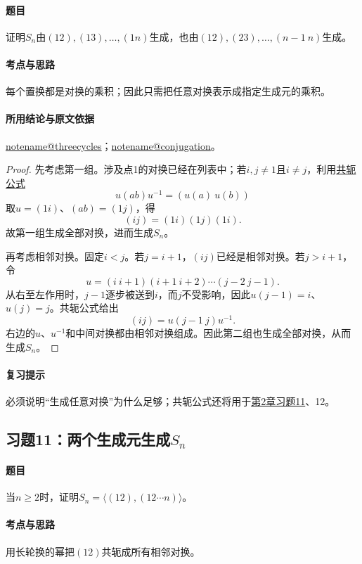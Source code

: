 \documentclass[UTF8,a4paper,11pt,fontset=windows]{ctexart}
\makeatletter
\newcommand{\noteref}[1]{\hyperref[note:#1]{\csname notename@#1\endcsname}}
\newcommand{\proofref}[2]{\hyperref[note:#1]{#2}}
\newcommand{\exref}[2]{\hyperref[ex:#1:#2]{第#1章习题#2}}
\makeatother
\begin{document}
\paragraph{题目}
证明$S_n$由$(12),(13),\ldots,(1n)$生成，也由$(12),(23),\ldots,(n-1\ n)$生成。

\paragraph{考点与思路}
每个置换都是对换的乘积；因此只需把任意对换表示成指定生成元的乘积。

\paragraph{所用结论与原文依据}
\noteref{threecycles}；\noteref{conjugation}。


\begin{proof}
先考虑第一组。涉及点1的对换已经在列表中；若$i,j\ne1$且$i\ne j$，利用\proofref{conjugation}{共轭公式}
\[
u(ab)u^{-1}=(u(a)\ u(b))
\]
取$u=(1i)$、$(ab)=(1j)$，得
\[
(ij)=(1i)(1j)(1i).
\]
故第一组生成全部对换，进而生成$S_n$。

再考虑相邻对换。固定$i<j$。若$j=i+1$，$(ij)$已经是相邻对换。若$j>i+1$，令
\[
u=(i\ i+1)(i+1\ i+2)\cdots(j-2\ j-1).
\]
从右至左作用时，$j-1$逐步被送到$i$，而$j$不受影响，因此$u(j-1)=i$、$u(j)=j$。共轭公式给出
\[
(ij)=u(j-1\ j)u^{-1}.
\]
右边的$u$、$u^{-1}$和中间对换都由相邻对换组成。因此第二组也生成全部对换，从而生成$S_n$。
\end{proof}

\paragraph{复习提示}
必须说明“生成任意对换”为什么足够；共轭公式还将用于\exref{2}{11}、12。


\subsection{习题11：\texorpdfstring{两个生成元生成$S_n$}{两个生成元生成Sn}}
\label{ex:2:11}

\paragraph{题目}
当$n\ge2$时，证明$S_n=\langle(12),(12\cdots n)\rangle$。

\paragraph{考点与思路}
用长轮换的幂把$(12)$共轭成所有相邻对换。
\end{document}

